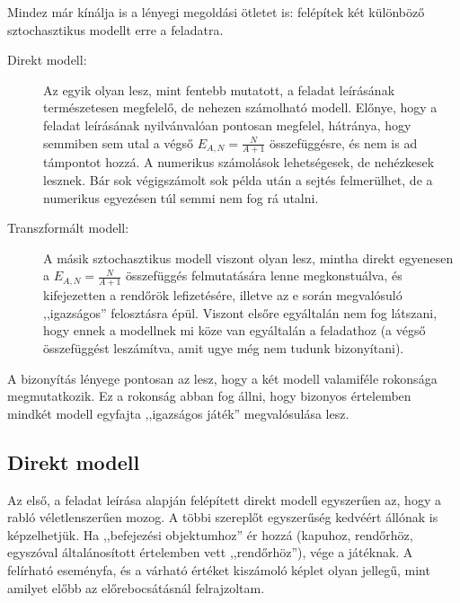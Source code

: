 \documentclass{article}
\begin{document}
	Mindez már kínálja is a lényegi megoldási ötletet is: felépítek két különböző sztochasztikus modellt erre a feladatra.
	\begin{description}
		\item[Direkt modell:]
		Az egyik olyan lesz, mint  fentebb mutatott, a feladat leírásának természetesen megfelelő, de nehezen számolható modell.
		Előnye, hogy a feladat leírásának nyilvánvalóan pontosan megfelel, hátránya, hogy semmiben sem utal a végső $E_{A,N} = \frac N{A+1}$ összefüggésre, és nem is ad támpontot hozzá.
		A numerikus számolások lehetségesek, de nehézkesek lesznek. Bár sok végigszámolt sok példa után a sejtés felmerülhet, de a numerikus egyezésen túl semmi nem fog rá utalni.
		\item[Transzformált modell:]
		A másik sztochasztikus modell viszont olyan lesz, mintha direkt egyenesen a $E_{A,N} = \frac N{A+1}$ összefüggés felmutatására lenne megkonstuálva,
		és kifejezetten a rendőrök lefizetésére, illetve az e során megvalósuló ,,igazságos'' felosztásra épül.
		Viszont elsőre  egyáltalán nem fog látszani, hogy ennek a modellnek mi köze van egyáltalán a feladathoz
		(a végső összefüggést leszámítva, amit ugye még nem tudunk bizonyítani).
	\end{description}
	A bizonyítás lényege pontosan az lesz, hogy a két modell valamiféle rokonsága megmutatkozik. Ez a rokonság abban fog állni, hogy bizonyos értelemben mindkét modell egyfajta ,,igazságos játék'' megvalósulása lesz.

	\subsection{Direkt modell}

	Az első, a feladat leírása alapján felépített direkt modell egyszerűen az, hogy a rabló véletlenszerűen mozog.
	A többi szereplőt egyszerűség kedvéért állónak is képzelhetjük.
	Ha ,,befejezési objektumhoz'' ér hozzá (kapuhoz, rendőrhöz, egyszóval általánosított értelemben vett ,,rendőrhöz''), vége a játéknak.
	A felírható eseményfa, és a várható értéket kiszámoló képlet olyan jellegű, mint amilyet előbb az előrebocsátásnál felrajzoltam.
\end{document}
